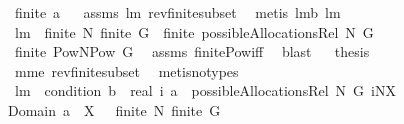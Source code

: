 \begin{isabellebody}
\ {\isachardoublequoteopen}finite\ a{\isachardoublequoteclose}%
\isadelimproof
\ %
\endisadelimproof
%
\isatagproof
{}\isamarkupfalse%
\ assms\ lm{}{}\ rev{\isacharunderscore}finite{\isacharunderscore}subset\ \isamarkupfalse%
\ {\isacharparenleft}metis\ lm{}{}b\ lm{}{}{\isacharparenright}%
\endisatagproof
{\isafoldproof}%
%
\isadelimproof
%
\endisadelimproof
\isanewline
\isanewline
{}\isamarkupfalse%
\ lm{}{}{\isacharcolon}\ \ {\isachardoublequoteopen}finite\ N{\isachardoublequoteclose}\ {\isachardoublequoteopen}finite\ G{\isachardoublequoteclose}\ \ {\isachardoublequoteopen}finite\ {\isacharparenleft}possibleAllocationsRel\ N\ G{\isacharparenright}{\isachardoublequoteclose}\isanewline
%
\isadelimproof
%
\endisadelimproof
%
\isatagproof
{}\isamarkupfalse%
\ {\isacharminus}\isanewline
{}\isamarkupfalse%
\ {\isachardoublequoteopen}finite\ {\isacharparenleft}Pow{\isacharparenleft}N{\isasymtimes}{\isacharparenleft}Pow\ G{\isacharminus}{\isacharbraceleft}{\isacharbraceleft}{\isacharbraceright}{\isacharbraceright}{\isacharparenright}{\isacharparenright}{\isacharparenright}{\isachardoublequoteclose}\ \isamarkupfalse%
\ assms\ finite{\isacharunderscore}Pow{\isacharunderscore}iff\ \isamarkupfalse%
\ blast\isanewline
{}\isamarkupfalse%
\ \isamarkupfalse%
\ {\isacharquery}thesis\ \isamarkupfalse%
\ mm{}{}e\ rev{\isacharunderscore}finite{\isacharunderscore}subset\ \isamarkupfalse%
\ {\isacharparenleft}metis{\isacharparenleft}no{\isacharunderscore}types{\isacharparenright}{\isacharparenright}\isanewline
{}\isamarkupfalse%
%
\endisatagproof
{\isafoldproof}%
%
\isadelimproof
\isanewline
%
\endisadelimproof
\isanewline
{}\isamarkupfalse%
\ lm{}{}{\isacharcolon}\ \ {\isachardoublequoteopen}condition{}\ {\isacharparenleft}b{\isacharcolon}{\isacharcolon}{\isacharunderscore}\ {\isacharequal}{\isachargreater}\ real{\isacharparenright}\ i{\isachardoublequoteclose}\ {\isachardoublequoteopen}a\ {\isasymin}\ possibleAllocationsRel\ N\ G{\isachardoublequoteclose}\ {\isachardoublequoteopen}i{\isasymin}N{\isacharminus}X{\isachardoublequoteclose}\ \isanewline
{\isachardoublequoteopen}Domain\ a\ {\isasyminter}\ X\ {\isasymnoteq}\ {\isacharbraceleft}{\isacharbraceright}{\isachardoublequoteclose}\ {\isachardoublequoteopen}finite\ N{\isachardoublequoteclose}\ {\isachardoublequoteopen}finite\ G{\isachardoublequoteclose}\ \isanewline

\end{isabellebody}
